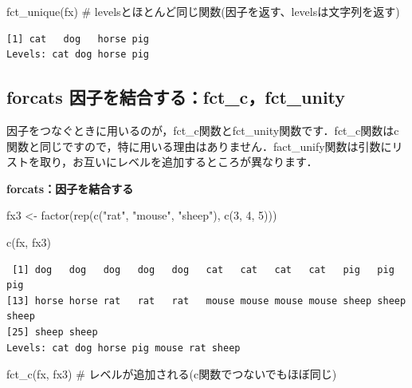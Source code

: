 \documentclass[
  letterpaper,
  DIV=11,
  numbers=noendperiod]{scrreprt}
\newenvironment{Shaded}{\begin{snugshade}}{\end{snugshade}}
\newcommand{\CommentTok}[1]{\textcolor[rgb]{0.37,0.37,0.37}{#1}}
\newcommand{\DecValTok}[1]{\textcolor[rgb]{0.68,0.00,0.00}{#1}}
\newcommand{\FunctionTok}[1]{\textcolor[rgb]{0.28,0.35,0.67}{#1}}
\newcommand{\NormalTok}[1]{\textcolor[rgb]{0.00,0.23,0.31}{#1}}
\newcommand{\OtherTok}[1]{\textcolor[rgb]{0.00,0.23,0.31}{#1}}
\newcommand{\StringTok}[1]{\textcolor[rgb]{0.13,0.47,0.30}{#1}}
\begin{document}
\begin{Shaded}
\begin{Highlighting}[]
\FunctionTok{fct\_unique}\NormalTok{(fx) }\CommentTok{\# levelsとほとんど同じ関数(因子を返す、levelsは文字列を返す)}
\end{Highlighting}
\end{Shaded}

\begin{verbatim}
[1] cat   dog   horse pig  
Levels: cat dog horse pig
\end{verbatim}

\hypertarget{forcats-ux56e0ux5b50ux3092ux7d50ux5408ux3059ux308bfct_cfct_unity}{%
\subsection{forcats
因子を結合する：fct\_c，fct\_unity}\label{forcats-ux56e0ux5b50ux3092ux7d50ux5408ux3059ux308bfct_cfct_unity}}

因子をつなぐときに用いるのが，fct\_c関数とfct\_unity関数です．fct\_c関数はc関数と同じですので，特に用いる理由はありません．fact\_unify関数は引数にリストを取り，お互いにレベルを追加するところが異なります．

\textbf{forcats：因子を結合する}

\begin{Shaded}
\begin{Highlighting}[]
\NormalTok{fx3 }\OtherTok{\textless{}{-}} \FunctionTok{factor}\NormalTok{(}\FunctionTok{rep}\NormalTok{(}\FunctionTok{c}\NormalTok{(}\StringTok{"rat"}\NormalTok{, }\StringTok{"mouse"}\NormalTok{, }\StringTok{"sheep"}\NormalTok{), }\FunctionTok{c}\NormalTok{(}\DecValTok{3}\NormalTok{, }\DecValTok{4}\NormalTok{, }\DecValTok{5}\NormalTok{)))}

\FunctionTok{c}\NormalTok{(fx, fx3)}
\end{Highlighting}
\end{Shaded}

\begin{verbatim}
 [1] dog   dog   dog   dog   dog   cat   cat   cat   cat   pig   pig   pig  
[13] horse horse rat   rat   rat   mouse mouse mouse mouse sheep sheep sheep
[25] sheep sheep
Levels: cat dog horse pig mouse rat sheep
\end{verbatim}

\begin{Shaded}
\begin{Highlighting}[]
\FunctionTok{fct\_c}\NormalTok{(fx, fx3) }\CommentTok{\# レベルが追加される(c関数でつないでもほぼ同じ)}
\end{Highlighting}
\end{Shaded}
\end{document}
